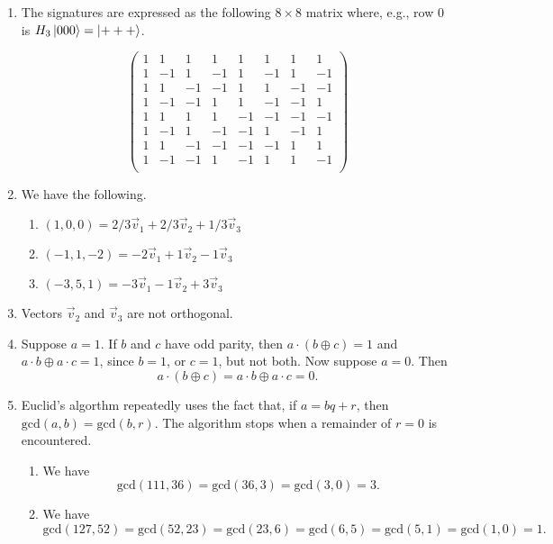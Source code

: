 \documentclass [12pt]{article}
\theoremstyle{definition}
\begin{document}
\begin{enumerate}
\item The signatures are expressed as the following $8\times 8$ matrix where, e.g., row 0 is $H_3\ket{000} =\ket{+++}$.

\[
\left(\begin{array}{cccccccc}
1 & 1 & 1 & 1 & 1 & 1 & 1 & 1\\
1 & -1 & 1 & -1 & 1 & -1 & 1 & -1\\
1 & 1 & -1 & -1 & 1 & 1 & -1 & -1\\
1 & -1 & -1 & 1 & 1 & -1 & -1 & 1\\
1 & 1 & 1 & 1 & -1 & -1 & -1 & -1\\
1 & -1 & 1 & -1 & -1 & 1 & -1 & 1\\
1 & 1 & -1 & -1 & -1 & -1 & 1 & 1\\
1 & -1 & -1 & 1 & -1 & 1 & 1 & -1\\
\end{array}\right)
\]






\item We have the following.

\begin{enumerate}
\item $(1,0,0) = 2/3\vec{v}_1 + 2/3\vec{v}_2 + 1/3\vec{v}_3$
\item $(-1,1,-2) = -2\vec{v}_1 + 1\vec{v}_2 - 1\vec{v}_3$
\item $(-3,5,1) = -3\vec{v}_1  - 1\vec{v}_2 + 3\vec{v}_3$
\end{enumerate}


\item Vectors $\vec{v}_2$ and $\vec{v}_3$ are not orthogonal.
 
\item Suppose $a=1$. If $b$ and $c$ have odd parity, then $a\cdot (b\oplus c)=1$ and 
 $a\cdot b \oplus a\cdot c = 1$, since $b=1$, or $c=1$, but not both. Now suppose $a=0$.
 Then 
 \[a\cdot (b\oplus c)= a\cdot b \oplus a\cdot c = 0.\]


\item Euclid's algorthm repeatedly uses the fact that, if $a=bq + r$, then  $\mbox{gcd}(a,b)=\mbox{gcd}(b,r)$. The algorithm stops when a remainder of $r=0$ is encountered.
\begin{enumerate}
\item We have
\[\mbox{gcd}(111,36) = \mbox{gcd}(36,3) = \mbox{gcd}(3,0) = 3.\]

\item We have
\[\mbox{gcd}(127,52) = \mbox{gcd}(52,23) = \mbox{gcd}(23,6) = \mbox{gcd}(6,5) = \mbox{gcd}(5,1) = \mbox{gcd}(1,0)  = 1.\]



\end{enumerate}
\end{enumerate}
\end{document}
